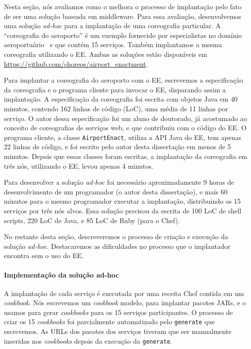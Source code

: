 Nesta seção, nós avaliamos como o \ee melhora o processo de implantação
pelo fato de ser uma solução baseada em middleware.
Para essa avaliação, desenvolvemos uma solução \emph{ad-hoc}
para a implantação de uma coreografia particular.
A ``coreografia do aeroporto'' é um exemplo fornecido por especialistas
no domínio aeroportuário~\cite{Choreos2012D6.2} e que contém 15 serviços.
Também implantamos a mesma coreografia utilizando o EE.
Ambas as soluções estão disponíveis em \url{https://github.com/choreos/airport_enactment}.

Para implantar a coreografia do aeroporto com o EE, escrevemos
a especificação da coreografia e o programa cliente para invocar o EE,
disparando assim a implantação.
A especificação da coreografia foi escrita com objetos Java em 40 minutos,
contendo 162 linhas de código (LoC), uma média de 11 linhas por serviço.
O autor dessa especificação foi um aluno de doutorado, já acostumado ao conceito
de coreografias de serviços web, e que contribuiu com o código do EE.
O programa cliente, a classe \texttt{AirportEnact}, utiliza a API Java do EE,
tem apenas 22 linhas de código, e foi escrito pelo autor desta dissertação
em menos de 5 minutos.
Depois que essas classes foram escritas, a implantação da coreografia em
três nós, utilizando o EE, levou apenas 4 minutos.

Para desenvolver a solução \emph{ad-hoc} foi necessário aproximadamente
9 horas de desenvolvimento de um programador (o autor desta dissertação), e mais 60 minutos
para o mesmo programador executar a implantação, distribuindo os 15
serviços por três nós alvos.
Essa solução precisou da escrita de 
100 LoC de shell scripts, 220 LoC de Java, e 85 LoC de Ruby (para o Chef). 

No restante desta seção, descreveremos o processo de criação e execução
da solução \emph{ad-hoc}. Destacaremos as dificuldades no processo
que o implantador encontra sem o uso do EE.

\paragraph{Implementação da solução ad-hoc}
A implantação de cada serviço é executada por uma receita Chef contida em um \emph{cookbook}.
Nós escrevemos um \emph{cookbook} modelo, para implantar pacotes JARs,
e o usamos para gerar \emph{cookbooks} para os 15 serviços participantes.
O processo de criar os 15 \emph{cookbooks} foi parcialmente automatizado
pelo \script \texttt{generate} que escrevemos.
As URLs dos pacotes dos serviços tiveram que ser manualmente inseridas nos
\emph{cookbooks} depois da execução da \script \texttt{generate}.

